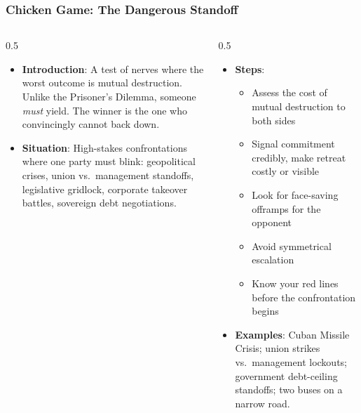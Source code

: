 \begin{frame}[fragile]\frametitle{Chicken Game: The Dangerous Standoff}
\begin{columns}
    \begin{column}[T]{0.5\linewidth}
      \begin{itemize}
        \item \textbf{Introduction}: A test of nerves where the worst outcome is mutual destruction. Unlike the Prisoner's Dilemma, someone \textit{must} yield. The winner is the one who convincingly cannot back down.
        \item \textbf{Situation}: High-stakes confrontations where one party must blink: geopolitical crises, union vs.\ management standoffs, legislative gridlock, corporate takeover battles, sovereign debt negotiations.
      \end{itemize}
    \end{column}
    \begin{column}[T]{0.5\linewidth}
      \begin{itemize}
        \item \textbf{Steps}:
        \begin{itemize}
          \item Assess the cost of mutual destruction to both sides
          \item Signal commitment credibly, make retreat costly or visible
          \item Look for face-saving offramps for the opponent
          \item Avoid symmetrical escalation
          \item Know your red lines before the confrontation begins
        \end{itemize}\item \textbf{Examples}: Cuban Missile Crisis; union strikes vs.\ management lockouts; government debt-ceiling standoffs; two buses on a narrow road.
      \end{itemize}
    \end{column}
  \end{columns}
\end{frame}


